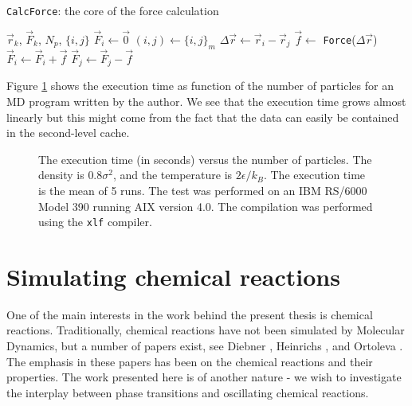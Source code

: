 \begin{algorithm}
  \caption[\texttt{CalcForce}: force calculation]{\texttt{CalcForce}: the core of the force calculation}
  \label{prg:CalcForceCore}
  \begin{algorithmic}
    \REQUIRE $\vec{r}_k$, $\vec{F}_k$, $N_p$, $\{i, j\}$
      \STATE $\vec{F}_i \leftarrow \vec{0}$
    \ENDFOR
      \STATE $(i, j) \leftarrow \{i, j\}_m$
      \STATE $\Delta\vec{r} \leftarrow \vec{r}_i-\vec{r}_j$
        \STATE $\vec{f} \leftarrow$ \texttt{Force}($\Delta\vec{r}$)
        \STATE $\vec{F}_i \leftarrow \vec{F}_i+\vec{f}$
        \STATE $\vec{F}_j \leftarrow \vec{F}_j-\vec{f}$
      \ENDIF
    \ENDFOR
  \end{algorithmic}
\end{algorithm}

Figure \ref{fig:ExecTime} shows the execution time as function of the
number of particles for an MD program written by the author. We see
that the execution time grows almost linearly but this might come from the
fact that the data can easily be contained in the second-level cache.


\begin{figure}
  
  \caption[Execution time]{The execution time (in seconds) versus the number of
    particles. The density is $0.8\sigma^2$, and the temperature is $2\epsilon/k_B$.
    The execution time is the mean of 5 runs. The test was performed on an
    IBM RS/6000 Model 390 running AIX version 4.0. The
    compilation was performed using the \texttt{xlf}
    compiler.\label{fig:ExecTime}}
\end{figure}



\section{Simulating chemical reactions}
\label{sect:SimulChemReact}
One of the main interests in the work behind the present thesis is
chemical reactions. Traditionally, chemical reactions have not been
simulated by Molecular Dynamics, but a number of papers exist, see \eg
Diebner \etal \cite{Diebner95}, Heinrichs \etal \cite{Heinrichs83}, and
Ortoleva \etal \cite{Ortoleva76}. The emphasis in these papers has been
on the chemical reactions and their properties. The work presented
here is of another nature - we wish to investigate the interplay
between phase transitions and oscillating chemical reactions.

